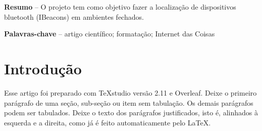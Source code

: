 \documentclass[
	article,			%
	12pt,				%
	oneside,			%
	a4paper,			%
	english,			%
	brazil,				%
	sumario=tradicional
	]{abntex2}
\begin{document}
\textual

\pagestyle{meuestilo}

\frenchspacing 

\maketitle

\thispagestyle{meuestilo}

\begin{changemargin}{1cm}{1cm} 
 \textbf{Resumo} – O projeto tem como objetivo fazer a localização de dispositivos bluetooth (IBeacons) em ambientes fechados.

 \vspace{\onelineskip}
 
 \noindent
 \textbf{Palavras-chave} – artigo científico; formatação; Internet das Coisas 
\end{changemargin}


\section{Introdução}

\let\thefootnote\svthefootnote

  Esse artigo foi preparado com TeXstudio versão 2.11 e Overleaf. Deixe o primeiro parágrafo de uma seção, sub-seção ou item sem tabulação. Os demais parágrafos podem ser tabulados.  Deixe o texto dos parágrafos justificados, isto é, alinhados à esquerda e a direita, como já é feito automaticamente pelo LaTeX.
    
\end{document}
